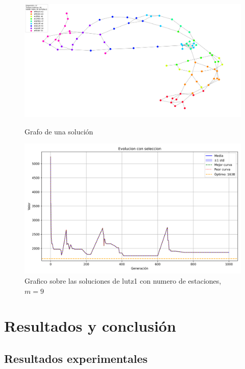 \documentclass[12pt,a4paper]{report}
\begin{document}
    \begin{figure}[H]
    \centering
    \begin{minipage}{0.48\textwidth}
        \centering
        \includegraphics[width=\linewidth]{DATA/grafo_lutz2.png}
        \caption{Grafo de una solución}
        \label{fig:figura1}
    \end{minipage}\hfill
    \begin{minipage}{0.48\textwidth}
        \centering
        \includegraphics[width=\linewidth]{DATA/lutz1_M9.png}
        \caption{Grafico sobre las soluciones de lutz1 con numero de estaciones, $m=9$}
        \label{fig:figura2}
    \end{minipage}
\end{figure}
\chapter{Resultados y conclusión}
\section{Resultados experimentales}
\end{document}
